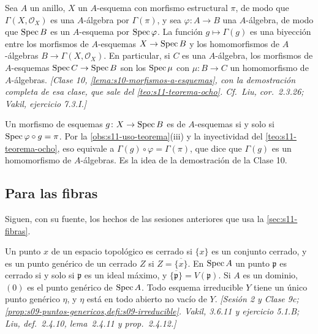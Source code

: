 \begin{lema}
\label{lema:s11-morfismos-a-esquemas}
Sea \(A\) un anillo, \(X\) un \(A\)-esquema con morfismo estructural \(\pi\), de modo que \(\Gamma(X,\mathcal O_X)\) es una \(A\)-álgebra por \(\Gamma(\pi)\), y sea \(\varphi\colon A\to B\) una \(A\)-álgebra, de modo que \(\operatorname{Spec} B\) es un \(A\)-esquema por \(\operatorname{Spec}\varphi\). La función \(g\mapsto\Gamma(g)\) es una biyección entre los morfismos de \(A\)-esquemas \(X\to\operatorname{Spec} B\) y los homomorfismos de \(A\)-álgebras \(B\to\Gamma(X,\mathcal O_X)\). En particular, si \(C\) es una \(A\)-álgebra, los morfismos de \(A\)-esquemas \(\operatorname{Spec} C\to\operatorname{Spec} B\) son los \(\operatorname{Spec}\mu\) con \(\mu\colon B\to C\) un homomorfismo de \(A\)-álgebras. \emph{[Clase 10, \cref{lema:s10-morfismos-a-esquemas}, con la demostración completa de esa clase, que sale del \cref{teo:s11-teorema-ocho}. Cf.~Liu, cor.~2.3.26; Vakil, ejercicio 7.3.I.]}
\end{lema}

Un morfismo de esquemas \(g\colon X\to\operatorname{Spec} B\) es de \(A\)-esquemas si y solo si \(\operatorname{Spec}\varphi\circ g=\pi\). Por la \cref{obs:s11-uso-teorema}(iii) y la inyectividad del \cref{teo:s11-teorema-ocho}, eso equivale a \(\Gamma(g)\circ\varphi=\Gamma(\pi)\), que dice que \(\Gamma(g)\) es un homomorfismo de \(A\)-álgebras. Es la idea de la demostración de la Clase 10.

\subsection{Para las fibras}

Siguen, con su fuente, los hechos de las sesiones anteriores que usa la \cref{sec:s11-fibras}.

\begin{defi}
\label{defi:s11-puntos-cerrados-genericos}
Un punto \(x\) de un espacio topológico es cerrado si \(\{x\}\) es un conjunto cerrado, y es un punto genérico de un cerrado \(Z\) si \(Z=\overline{\{x\}}\). En \(\operatorname{Spec} A\) un punto \(\mathfrak p\) es cerrado si y solo si \(\mathfrak p\) es un ideal máximo, y \(\overline{\{\mathfrak p\}}=V(\mathfrak p)\). Si \(A\) es un dominio, \((0)\) es el punto genérico de \(\operatorname{Spec} A\). Todo esquema irreducible \(Y\) tiene un único punto genérico \(\eta\), y \(\eta\) está en todo abierto no vacío de \(Y\). \emph{[Sesión 2 y Clase 9c; \cref{prop:s09-puntos-genericos,defi:s09-irreducible}. Vakil, 3.6.11 y ejercicio 5.1.B; Liu, def.~2.4.10, lema~2.4.11 y prop.~2.4.12.]}
\end{defi}

